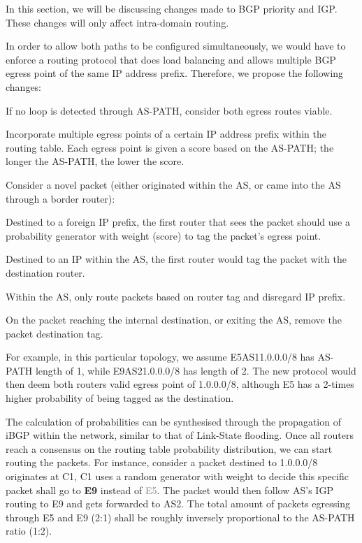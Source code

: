 \documentclass[12pt]{article}
\newcommand{\SubItem}[1]{
    {\setlength\itemindent{15pt} \item[-] #1}
}
\begin{document}
In this section, we will be discussing changes made to BGP priority and IGP. These changes will only affect intra-domain routing.

In order to allow both paths to be configured simultaneously, we would have to enforce a routing protocol that does load balancing and allows multiple BGP egress point of the same IP address prefix. Therefore, we propose the following changes:

\begin{itemize}
    \item If no loop is detected through AS-PATH, consider both egress routes viable.
    \item Incorporate multiple egress points of a certain IP address prefix within the routing table. Each egress point is given a score based on the AS-PATH; the longer the AS-PATH, the lower the score.
    \item Consider a novel packet (either originated within the AS, or came into the AS through a border router):
    \SubItem{Destined to a foreign IP prefix, the first router that sees the packet should use a probability generator with weight (score) to tag the packet's egress point.}
    \SubItem{Destined to an IP within the AS, the first router would tag the packet with the destination router.}
    \item Within the AS, only route packets based on router tag and disregard IP prefix.
    \item On the packet reaching the internal destination, or exiting the AS, remove the packet destination tag.
\end{itemize}

For example, in this particular topology, we assume E5\textrightarrow{}AS1\textrightarrow{}1.0.0.0/8 has AS-PATH length of 1, while E9\textrightarrow{}AS2\textrightarrow{}1.0.0.0/8 has length of 2. The new protocol would then deem both routers valid egress point of 1.0.0.0/8, although E5 has a 2-times higher probability of being tagged as the destination.

The calculation of probabilities can be synthesised through the propagation of iBGP within the network, similar to that of Link-State flooding. Once all routers reach a consensus on the routing table probability distribution, we can start routing the packets. For instance, consider a packet destined to 1.0.0.0/8 originates at C1, C1 uses a random generator with weight to decide this specific packet shall go to \textbf{E9} instead of \textcolor{grey}{E5}. The packet would then follow AS's IGP routing to E9 and gets forwarded to AS2. The total amount of packets egressing through E5 and E9 (2:1) shall be roughly inversely proportional to the AS-PATH ratio (1:2).
\end{document}
